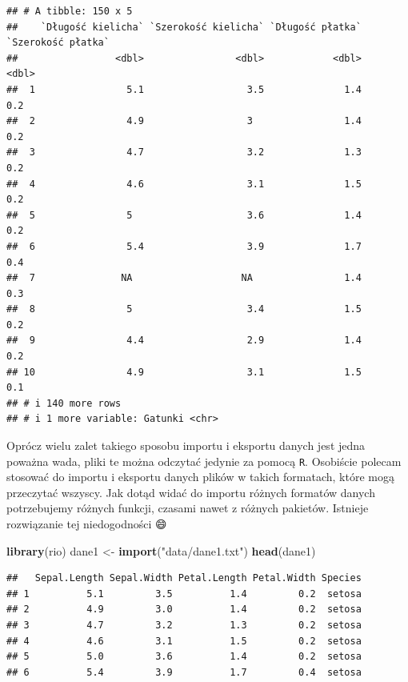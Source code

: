\documentclass[
]{book}
\newenvironment{Shaded}{\begin{snugshade}}{\end{snugshade}}
\newcommand{\FunctionTok}[1]{\textcolor[rgb]{0.13,0.29,0.53}{\textbf{#1}}}
\newcommand{\NormalTok}[1]{#1}
\newcommand{\OtherTok}[1]{\textcolor[rgb]{0.56,0.35,0.01}{#1}}
\newcommand{\StringTok}[1]{\textcolor[rgb]{0.31,0.60,0.02}{#1}}
\theoremstyle{plain}
\theoremstyle{definition}
\theoremstyle{definition}
\theoremstyle{definition}
\theoremstyle{definition}
\theoremstyle{definition}
\theoremstyle{remark}
\begin{document}
\begin{verbatim}
## # A tibble: 150 x 5
##    `Długość kielicha` `Szerokość kielicha` `Długość płatka` `Szerokość płatka`
##                 <dbl>                <dbl>            <dbl>              <dbl>
##  1                5.1                  3.5              1.4                0.2
##  2                4.9                  3                1.4                0.2
##  3                4.7                  3.2              1.3                0.2
##  4                4.6                  3.1              1.5                0.2
##  5                5                    3.6              1.4                0.2
##  6                5.4                  3.9              1.7                0.4
##  7               NA                   NA                1.4                0.3
##  8                5                    3.4              1.5                0.2
##  9                4.4                  2.9              1.4                0.2
## 10                4.9                  3.1              1.5                0.1
## # i 140 more rows
## # i 1 more variable: Gatunki <chr>
\end{verbatim}

Oprócz wielu zalet takiego sposobu importu i eksportu danych jest jedna poważna wada, pliki te można odczytać jedynie za pomocą \texttt{R}. Osobiście polecam stosować do importu i eksportu danych plików w takich formatach, które mogą przeczytać wszyscy. Jak dotąd widać do importu różnych formatów danych potrzebujemy różnych funkcji, czasami nawet z różnych pakietów. Istnieje rozwiązanie tej niedogodności 😄

\begin{Shaded}
\begin{Highlighting}[]
\FunctionTok{library}\NormalTok{(rio)}
\NormalTok{dane1 }\OtherTok{\textless{}{-}} \FunctionTok{import}\NormalTok{(}\StringTok{"data/dane1.txt"}\NormalTok{)}
\FunctionTok{head}\NormalTok{(dane1)}
\end{Highlighting}
\end{Shaded}

\begin{verbatim}
##   Sepal.Length Sepal.Width Petal.Length Petal.Width Species
## 1          5.1         3.5          1.4         0.2  setosa
## 2          4.9         3.0          1.4         0.2  setosa
## 3          4.7         3.2          1.3         0.2  setosa
## 4          4.6         3.1          1.5         0.2  setosa
## 5          5.0         3.6          1.4         0.2  setosa
## 6          5.4         3.9          1.7         0.4  setosa
\end{verbatim}
\end{document}
